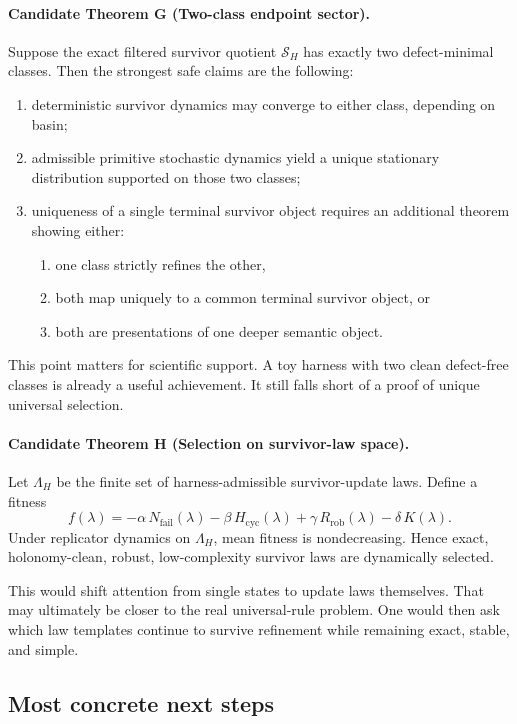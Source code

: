 \documentclass[11pt]{article}
\theoremstyle{remark}
\theoremstyle{plain}
\begin{document}
\paragraph{Candidate Theorem G (Two-class endpoint sector).}
Suppose the exact filtered survivor quotient \(\mathcal S_H\) has exactly two defect-minimal classes. Then the strongest safe claims are the following:
\begin{enumerate}[leftmargin=2em]
\item deterministic survivor dynamics may converge to either class, depending on basin;
\item admissible primitive stochastic dynamics yield a unique stationary distribution supported on those two classes;
\item uniqueness of a single terminal survivor object requires an additional theorem showing either:
\begin{enumerate}[leftmargin=2em]
\item one class strictly refines the other,
\item both map uniquely to a common terminal survivor object, or
\item both are presentations of one deeper semantic object.
\end{enumerate}
\end{enumerate}

This point matters for scientific support. A toy harness with two clean defect-free classes is already a useful achievement. It still falls short of a proof of unique universal selection.

\paragraph{Candidate Theorem H (Selection on survivor-law space).}
Let \(\Lambda_H\) be the finite set of harness-admissible survivor-update laws. Define a fitness
\[
f(\lambda)=
-\alpha\,N_{\mathrm{fail}}(\lambda)
-\beta\,H_{\mathrm{cyc}}(\lambda)
+\gamma\,R_{\mathrm{rob}}(\lambda)
-\delta\,K(\lambda).
\]
Under replicator dynamics on \(\Lambda_H\), mean fitness is nondecreasing. Hence exact, holonomy-clean, robust, low-complexity survivor laws are dynamically selected.

This would shift attention from single states to update laws themselves. That may ultimately be closer to the real universal-rule problem. One would then ask which law templates continue to survive refinement while remaining exact, stable, and simple.

\subsection{Most concrete next steps}
\end{document}
